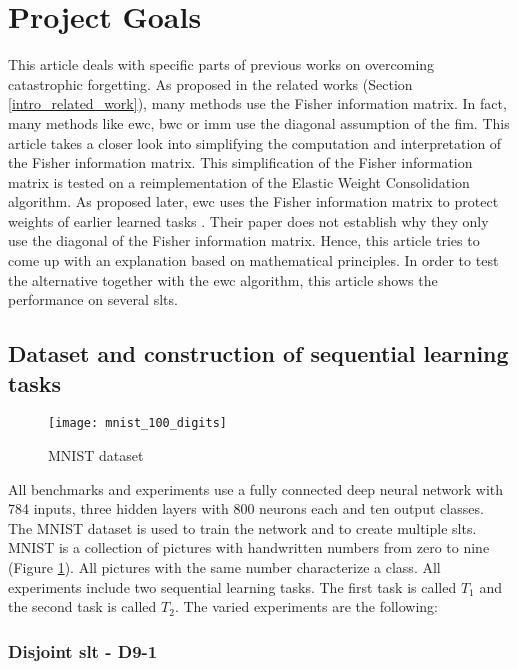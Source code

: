 \section{Project Goals}
\label{project_goals}

This article deals with specific parts of previous works on overcoming catastrophic forgetting.
As proposed in the related works (Section \ref{intro_related_work}), many methods use the Fisher information matrix.
In fact, many methods like \acrshort{ewc}, \acrshort{bwc} or \acrshort{imm} use the diagonal assumption of the \acrshort{fim}.
This article takes a closer look into simplifying the computation and interpretation of the Fisher information matrix.
This simplification of the Fisher information matrix is tested on a reimplementation of the Elastic Weight Consolidation algorithm.
As proposed later, \acrshort{ewc} uses the Fisher information matrix to protect weights of earlier learned tasks \cite{elastic-weight-consolidation}.
Their paper does not establish why they only use the diagonal of the Fisher information matrix.
Hence, this article tries to come up with an explanation based on mathematical principles.
In order to test the alternative together with the \acrshort{ewc} algorithm, this article shows the performance on several \acrlong{slt}s.

\subsection*{Dataset and construction of sequential learning tasks}

\begin{figure}[H]
    \centering
    \texttt{[image: mnist\_100\_digits]}
    \caption{\cite{mnist_examples_image} MNIST dataset}
    \label{fig:intro_mnist_examples}
\end{figure}

All benchmarks and experiments use a fully connected deep neural network with 784 inputs, three hidden layers with 800 neurons each and ten output classes.
The MNIST dataset is used to train the network and to create multiple \acrlong{slt}s.
MNIST is a collection of pictures with handwritten numbers from zero to nine (Figure \ref{fig:intro_mnist_examples}).
All pictures with the same number characterize a class.
\newline
All experiments include two sequential learning tasks.
The first task is called $T_1$ and the second task is called $T_2$.
The varied experiments are the following:

\subsubsection*{Disjoint \acrshort{slt} - D9-1}

